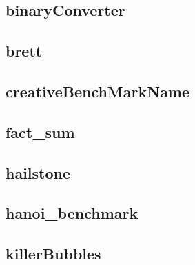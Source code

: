 \newpage
\subsection{binaryConverter}
    \begin{figure}[h]
	    \centering
		
	\end{figure}


\newpage
\subsection{brett}
    \begin{figure}[h]
	    \centering
		
	\end{figure}


\newpage
\subsection{creativeBenchMarkName}
    \begin{figure}[h]
	    \centering
		
	\end{figure}


\newpage
\subsection{fact\_sum}
    \begin{figure}[h]
	    \centering
		
	\end{figure}


\newpage
\subsection{hailstone}
    \begin{figure}[h]
	    \centering
		
	\end{figure}


\newpage
\subsection{hanoi\_benchmark}
    \begin{figure}[h]
	    \centering
		
	\end{figure}


\newpage
\subsection{killerBubbles}
    \begin{figure}[h]
	    \centering
		
	\end{figure}


